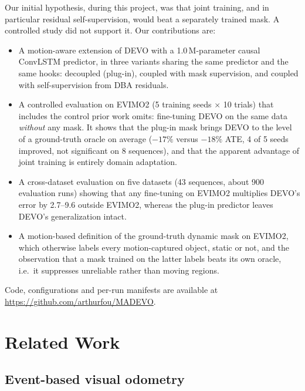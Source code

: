 \documentclass[conference]{IEEEtran}
\begin{document}
Our initial hypothesis, during this project, was that joint training, and in particular
residual self-supervision, would beat a separately trained mask. A controlled study did not
support it. Our contributions are:
\begin{itemize}
\item A motion-aware extension of DEVO with a 1.0\,M-parameter causal ConvLSTM predictor,
  in three variants sharing the same predictor and the same hooks: decoupled (plug-in),
  coupled with mask supervision, and coupled with self-supervision from DBA residuals.
\item A controlled evaluation on EVIMO2 (5 training seeds $\times$ 10 trials) that includes
  the control prior work omits: fine-tuning DEVO on the same data \emph{without} any mask.
  It shows that the plug-in mask brings DEVO to the level of a ground-truth oracle on
  average ($-17\%$ versus $-18\%$ ATE, 4 of 5 seeds improved, not significant on 8
  sequences), and that the apparent advantage of joint training is entirely domain
  adaptation.
\item A cross-dataset evaluation on five datasets (43 sequences, about 900 evaluation runs)
  showing that any fine-tuning on EVIMO2 multiplies DEVO's error by 2.7--9.6 outside
  EVIMO2, whereas the plug-in predictor leaves DEVO's generalization intact.
\item A motion-based definition of the ground-truth dynamic mask on EVIMO2, which otherwise
  labels every motion-captured object, static or not, and the observation that a mask
  trained on the latter labels beats its own oracle, i.e.\ it suppresses unreliable rather
  than moving regions.
\end{itemize}
Code, configurations and per-run manifests are available at
\url{https://github.com/arthurfou/MADEVO}.

\section{Related Work}

\subsection{Event-based visual odometry}
\end{document}
